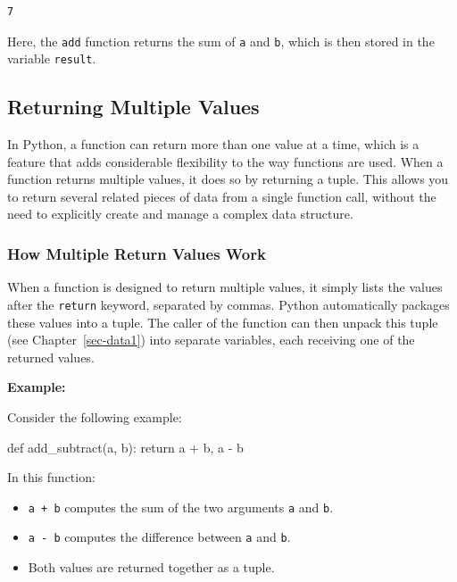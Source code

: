 \documentclass[
  letterpaper,
  DIV=11,
  numbers=noendperiod]{scrreprt}
\newenvironment{Shaded}{\begin{snugshade}}{\end{snugshade}}
\newcommand{\ControlFlowTok}[1]{\textcolor[rgb]{0.00,0.23,0.31}{#1}}
\newcommand{\KeywordTok}[1]{\textcolor[rgb]{0.00,0.23,0.31}{#1}}
\newcommand{\NormalTok}[1]{\textcolor[rgb]{0.00,0.23,0.31}{#1}}
\newcommand{\OperatorTok}[1]{\textcolor[rgb]{0.37,0.37,0.37}{#1}}
\providecommand{\tightlist}{%
  \setlength{\itemsep}{0pt}\setlength{\parskip}{0pt}}\usepackage{longtable,booktabs,array}
\begin{document}
\begin{verbatim}
7
\end{verbatim}

Here, the \texttt{add} function returns the sum of \texttt{a} and
\texttt{b}, which is then stored in the variable \texttt{result}.

\hypertarget{returning-multiple-values}{%
\subsection{Returning Multiple Values}\label{returning-multiple-values}}

In Python, a function can return more than one value at a time, which is
a feature that adds considerable flexibility to the way functions are
used. When a function returns multiple values, it does so by returning a
tuple. This allows you to return several related pieces of data from a
single function call, without the need to explicitly create and manage a
complex data structure.

\hypertarget{how-multiple-return-values-work}{%
\subsubsection{How Multiple Return Values
Work}\label{how-multiple-return-values-work}}

When a function is designed to return multiple values, it simply lists
the values after the \texttt{return} keyword, separated by commas.
Python automatically packages these values into a tuple. The caller of
the function can then unpack this tuple (see Chapter~\ref{sec-data1})
into separate variables, each receiving one of the returned values.

\textbf{Example:}

Consider the following example:

\begin{Shaded}
\begin{Highlighting}[]
\KeywordTok{def}\NormalTok{ add\_subtract(a, b):}
    \ControlFlowTok{return}\NormalTok{ a }\OperatorTok{+}\NormalTok{ b, a }\OperatorTok{{-}}\NormalTok{ b}
\end{Highlighting}
\end{Shaded}

In this function:

\begin{itemize}
\tightlist
\item
  \texttt{a\ +\ b} computes the sum of the two arguments \texttt{a} and
  \texttt{b}.
\item
  \texttt{a\ -\ b} computes the difference between \texttt{a} and
  \texttt{b}.
\item
  Both values are returned together as a tuple.
\end{itemize}
\end{document}
